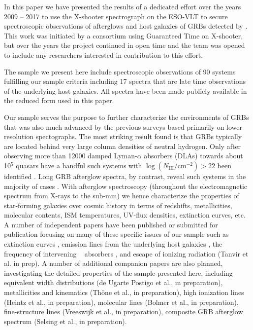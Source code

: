 \documentclass{aa}    %
\begin{document}
In this paper we have presented the results of a dedicated effort over the years
2009 -- 2017 to use the X-shooter spectrograph on the ESO-VLT to secure
spectroscopic observations of afterglows and host galaxies of GRBs detected by
\swift. This work was initiated by a consortium using Guaranteed Time on
X-shooter, but over the years the project continued in open time and the team
was opened to include any researchers interested in contribution to this effort.

The sample we present here include spectroscopic observations of 90 systems
fulfilling our sample criteria including 17 spectra that are late time
observations of the underlying host galaxies. All spectra have been made
publicly available in the reduced form used in this paper.

Our sample serves the purpose to further characterize the environments of GRBs
that was also much advanced by the previous surveys based primarily on
lower-resolution spectographs. The most striking result found is that GRBs
typically are located behind very large column densities of neutral hydrogen.
Only after observing more than 12000 damped Lyman-$\alpha$ absorbers (DLAs)
towards about 10$^5$ quasars have a handful such systems with
$\log({N_\mathrm{HI}/\mathrm{cm^{-2}}}) > 22$ been identified \citep[e.g., five
in][]{Noterdaeme2012b}. Long GRB afterglow spectra, by contrast, reveal such
systems in the majority of cases \citep[][and this work]{Jakobsson2006b,
	Fynbo2009, Cucchiara2015}.  With afterglow spectroscopy (throughout the
electromagnetic spectrum from X-rays to the sub-mm) we hence characterize the
properties of star-forming galaxies over cosmic history in terms of redshifts,
metallicities, molecular contents, ISM temperatures, UV-flux densities,
extinction curves, etc.  A number of independent papers have been published or
submitted for publication focusing on many of these specific issues of our
sample such as extinction curves \citep[][see also \citealt{Fynbo2014,
	Heintz2017}]{Japelj2015, Zafar17}, emission lines from the underlying host
galaxies \citep{Kruhler2015}, the frequency of intervening \mgii~ absorbers
\citep{Christensen2017}, and escape of ionizing radiation (Tanvir et al. in
prep). A number of additional companion papers are also planned,
investigating the detailed properties of the sample presented here, including
equivalent width distributions (de Ugarte Postigo et al., in preparation),
metallicities and kinematics (Th{\"o}ne et al., in preparation), high ionization
lines (Heintz et al., in preparation), molecular lines (Bolmer et al., in
preparation), fine-structure lines (Vreeswijk et al., in preparation), composite
GRB afterglow spectrum (Selsing et al., in preparation).
\end{document}
